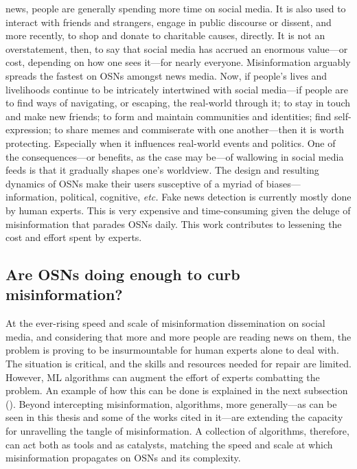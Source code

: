  news, people are generally spending more time on social media. It is also used to interact with friends and strangers, engage in public discourse or dissent, and more recently, to shop and donate to charitable causes, directly. It is not an overstatement, then, to say that social media has accrued an enormous value—or cost, depending on how one sees it—for nearly everyone. Misinformation arguably spreads the fastest on \acp{OSN} amongst news media. Now, if people's lives and livelihoods continue to be intricately intertwined with social media—if people are to find ways of navigating, or escaping, the real-world through it; to stay in touch and make new friends; to form and maintain communities and identities; find self-expression; to share memes and commiserate with one another—then it is worth protecting. Especially when it influences real-world events and politics. One of the consequences—or benefits, as the case may be—of wallowing in social media feeds is that it gradually shapes one's worldview. The design and resulting dynamics of \acp{OSN} make their users susceptive of a myriad of biases—information, political, cognitive, \emph{etc.} Fake news detection is currently mostly done by human experts. This is very expensive and time-consuming given the deluge of misinformation that parades \acp{OSN} daily. This work contributes to lessening the cost and effort spent by experts.

\subsection{Are OSNs doing enough to curb misinformation?}
\label{ssec:1-efforts}

At the ever-rising speed and scale of misinformation dissemination on social media, and considering that more and more people are reading news on them, the problem is proving to be insurmountable for human experts alone to deal with. The situation is critical, and the skills and resources needed for repair are limited. However, \ac{ML} algorithms can augment the effort of experts combatting the problem. An example of how this can be done is explained in the next subsection (). Beyond intercepting misinformation, algorithms, more generally—as can be seen in this thesis and some of the works cited in it—are extending the capacity for unravelling the tangle of misinformation. A collection of algorithms, therefore, can act both as tools and as catalysts, matching the speed and scale at which misinformation propagates on \acp{OSN} and its complexity.

